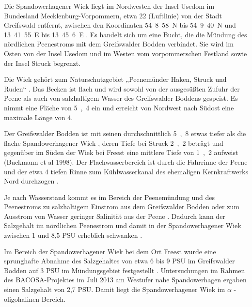 Die Spandowerhagener Wiek liegt im Nordwesten der Insel Usedom im Bundesland Mecklenburg-Vorpommern, etwa \unit{22}{\kilo\metre} (Luftlinie) von der Stadt Greifswald entfernt, zwischen den Koordinaten 54\textdegree\ 8\textquotesingle\ 58\dq\ N bis 54\textdegree\ 9\textquotesingle\ 40\dq\ N und 13\textdegree\ 41\textquotesingle\ 55\dq\ E bis 13\textdegree\ 45\textquotesingle\ 6\dq\ E \citep{nathansen_2014}. 
Es handelt sich um eine Bucht, die die Mündung des nördlichen Peenestroms mit dem Greifswalder Bodden verbindet. Sie wird im Osten von der Insel Usedom und im Westen vom vorpommerschen Festland sowie der Insel Struck begrenzt. 

Die Wiek gehört zum Naturschutzgebiet „Peenemünder Haken, Struck und Ruden“ \citep{niedermeyer_2011}.
Das Becken ist flach und wird sowohl von der ausgesüßten Zufuhr der Peene als auch von salzhaltigem Wasser des Greifswalder Boddens gespeist. Es nimmt eine Fläche von \unit{5,4}{\kilo\metre\squared} ein \citep{niedermeyer_2011} und erreicht von Nordwest nach Südost eine maximale Länge von \unit{4}{\kilo\metre}.

Der Greifswalder Bodden ist mit seinen durchschnittlich \unit{5,8}{\metre} etwas tiefer als die flache Spandowerhagener Wiek \citep{meyer_1998}, deren Tiefe bei Struck \unit{2,2}{\metre} beträgt \citep{bartels_1998} und gegenüber im Süden der Wiek bei Freest eine mittlere Tiefe von \unit{1,2}{\metre} aufweist (Buckmann et al 1998). Der Flachwasserbereich ist durch die Fahrrinne der Peene und der etwa \unit{4}{\metre} tiefen Rinne zum Kühlwasserkanal des ehemaligen Kernkraftwerks Nord durchzogen \citep{gosselck_2007}.

Je nach Wasserstand kommt es im Bereich der Peenemündung und des Peenestroms zu salzhaltigem Einstrom aus dem Greifswalder Bodden oder zum Ausstrom von Wasser geringer Salinität aus der Peene \citep{buckmann_1998}. Dadurch kann der Salzgehalt im nördlichen Peenestrom und damit in der Spandowerhagener Wiek zwischen 1 und 8,5 PSU erheblich schwanken \citep{meyer_1998}.

Im Bereich der Spandowerhagener Wiek bei dem Ort Freest wurde eine sprunghafte Abnahme des Salzgehaltes von etwa 6 bis 9 PSU im Greifswalder Bodden auf 3 PSU im Mündungsgebiet festgestellt \citep{gunther_1998}. Untersuchungen im Rahmen des BACOSA-Projektes im Juli 2013 am Westufer nahe Spandowerhagen ergaben einen Salzgehalt von 2,7 PSU. Damit liegt die Spandowerhagener Wiek im $\alpha$ - oligohalinen Bereich.




